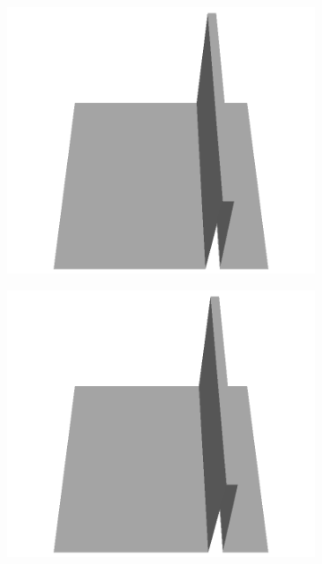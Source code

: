 \documentclass[../document.tex]{subfiles}
\begin{document}
\begin{figure}[H]
\begin{subfigure}[b]{0.065\textwidth}
    \includegraphics[width=\linewidth]{../img/5/custom_patches/walls_front/all/35-3d.png}
    \end{subfigure}
    \begin{subfigure}[b]{0.065\textwidth}
    \includegraphics[width=\linewidth]{../img/5/custom_patches/walls_front/all/34-3d.png}
    \end{subfigure}
    \begin{subfigure}[b]{0.065\textwidth}

\end{subfigure}
\end{figure}
\end{document}
